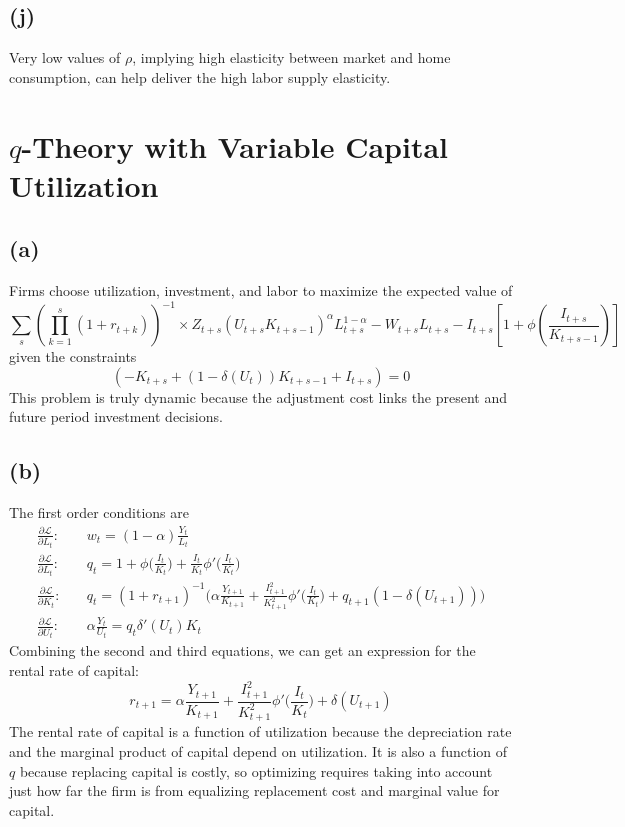 \documentclass[11pt]{amsart}
\begin{document}
\subsection*{(j)}

Very low values of $\rho$, implying high elasticity between market and home consumption, can help deliver the high labor supply elasticity.




\section{$q$-Theory with Variable Capital Utilization}

\subsection*{(a)}

Firms choose utilization, investment, and labor to maximize the expected value of 
\[
\sum_{s} \left( \prod_{k=1}^{s} \left(1 + r_{t+k} \right) \right)^{-1} 
\times   Z_{t+s} \left( U_{t+s} K_{t+s-1}  \right)^{\alpha} L_{t+s}^{1-\alpha}  - W_{t+s} L_{t+s} - I_{t+s} \left[ 1 + \phi \left( \frac{I_{t+s}}{K_{t+s-1}} \right) \right] 
\]
given the constraints
\[
\left( -K_{t+s} + (1-\delta(U_t))K_{t+s-1} + I_{t+s} \right) = 0
\]
This problem is truly dynamic because the adjustment cost links the present and future period investment decisions. 

\subsection*{(b)}
The first order conditions are
\begin{align*}
		\frac{\partial \mathcal{L}}{\partial L_t}: &\quad  w_t = (1-\alpha) \frac{Y_t}{L_t} \\
		\frac{\partial \mathcal{L}}{\partial L_t}: & \quad q_t = 1 + \phi \bigg ( \frac{I_t}{K_t} \bigg ) + \frac{I_t}{K_t} \phi' \bigg ( \frac{I_t}{K_t} \bigg ) \\
		\frac{\partial \mathcal{L}}{\partial K_t}: & \quad q_t = (1+r_{t+1})^{-1} \bigg ( \alpha \frac{Y_{t+1}}{K_{t+1}} + \frac{I_{t+1}^2}{K_{t+1}^2} \phi' \bigg ( \frac{I_t}{K_t} \bigg ) + q_{t+1} (1-\delta(U_{t+1})) \bigg ) \\
		\frac{\partial \mathcal{L}}{\partial U_t}: &\quad  \alpha \frac{Y_t}{U_t} = q_t \delta'(U_t) K_t
	\end{align*}
	Combining the second and third equations, we can get an expression for the rental rate of capital: 
	\begin{equation*}
	r_{t+1} = \alpha \frac{Y_{t+1}}{K_{t+1}} + \frac{I_{t+1}^2}{K_{t+1}^2} \phi' \bigg ( \frac{I_t}{K_t} \bigg )  + \delta(U_{t+1})
	\end{equation*}
	The rental rate of capital is a function of utilization because the depreciation rate and the marginal product of capital depend on utilization. 
	It is also a function of $q$ because replacing capital is costly, so optimizing requires taking into account just how far the firm is from equalizing replacement cost and marginal value for capital.
	
\end{document}
